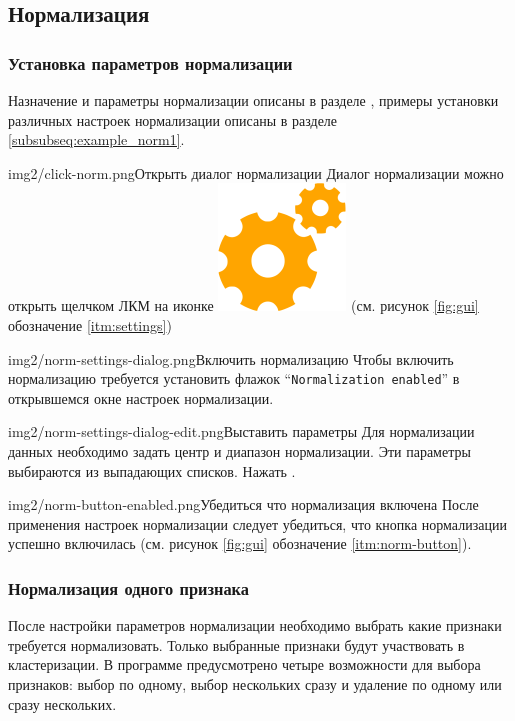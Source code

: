 \documentclass[12pt,tikz]{instruction}
\begin{document}
\subsection{Нормализация}
\label{sec:norm}
\subsubsection{Установка параметров нормализации}

Назначение и параметры нормализации описаны в разделе , примеры установки различных настроек нормализации описаны в разделе \ref{subsubseq:example_norm1}.
\begin{steps}
	\begin{ist}{img2/click-norm.png}{Открыть диалог нормализации}
		Диалог нормализации можно открыть щелчком ЛКМ на иконке \includegraphics[scale=0.1]{img2/settings.png} (см. рисунок \ref{fig:gui} обозначение \ref{itm:settings})
	\end{ist}
	\begin{ist}{img2/norm-settings-dialog.png}{Включить нормализацию}
		Чтобы включить нормализацию требуется установить флажок ``\texttt{Normalization enabled}'' в открывшемся окне настроек нормализации.
	\end{ist}
	\begin{ist}{img2/norm-settings-dialog-edit.png}{Выставить параметры}
		Для нормализации данных необходимо задать центр и диапазон нормализации. Эти параметры выбираются из выпадающих списков. Нажать .
	\end{ist}
	\begin{ist}{img2/norm-button-enabled.png}{Убедиться что нормализация включена}
		После применения настроек нормализации следует убедиться, что кнопка нормализации успешно включилась (см. рисунок \ref{fig:gui} обозначение \ref{itm:norm-button}).	
	\end{ist}	
\end{steps}

\newpage
\subsubsection{Нормализация одного признака}
\label{subsubsec:onenorm}
После настройки параметров нормализации необходимо выбрать какие признаки требуется нормализовать. Только выбранные признаки будут участвовать в кластеризации. В программе предусмотрено четыре возможности для выбора признаков: выбор по одному, выбор нескольких сразу и удаление по одному или сразу нескольких. 
\end{document}
